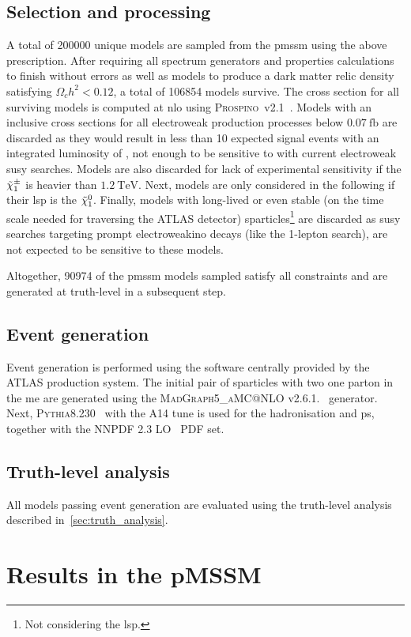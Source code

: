 \subsection{Selection and processing}

A total of \num[group-separator={,}]{200000} unique models are sampled from the \gls{pmssm} using the above prescription. After requiring all spectrum generators and properties calculations to finish without errors as well as models to produce a dark matter relic density satisfying $\Omega_c h^2 < 0.12$, a total of \num[group-separator={,}]{106854} models survive. The cross section for all surviving models is computed at \gls{nlo} using \textsc{Prospino}~v2.1~\cite{prospino:314229, prospino_2:1999xh}. Models with an inclusive cross sections for all electroweak production processes below $\SI{0.07}{\femto\barn}$ are discarded as they would result in less than 10 expected signal events with an integrated luminosity of \onethirtynineifb, not enough to be sensitive to with current electroweak \gls{susy} searches. Models are also discarded for lack of experimental sensitivity if the $\tilde{\chi}_1^\pm$ is heavier than $\SI{1.2}{\TeV}$. Next, models are only considered in the following if their \gls{lsp} is the $\tilde{\chi}_1^0$. Finally, models with long-lived or even stable (on the time scale needed for traversing the ATLAS detector) sparticles\footnote{Not considering the \gls{lsp}.} are discarded as \gls{susy} searches targeting prompt electroweakino decays (like the 1-lepton search), are not expected to be sensitive to these models. 

Altogether, \num[group-separator={,}]{90974} of the \gls{pmssm} models sampled satisfy all constraints and are generated at truth-level in a subsequent step. 

\subsection{Event generation}

Event generation is performed using the software centrally provided by the ATLAS production system. The initial pair of sparticles with two one parton in the \gls{me} are generated using the \textsc{MadGraph5\_aMC@NLO} v2.6.1.~\cite{MGaMCNLO:2014hca,Frederix:2012ps} generator. Next, \textsc{Pythia8.230}~\cite{Pythia8:2007gs}  with the \textsc{A14} tune is used for the hadronisation and \gls{ps}, together with the NNPDF 2.3 LO~\cite{Ball:2012cx} \gls{PDF} set.
		
\subsection{Truth-level analysis}

All models passing event generation are evaluated using the truth-level analysis described in~\cref{sec:truth_analysis}.


\section{Results in the pMSSM}
